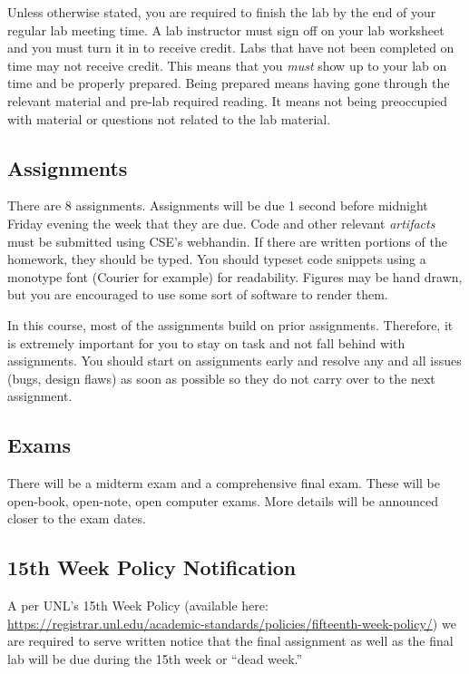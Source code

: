 \documentclass[12pt]{scrartcl}
\begin{document}
Unless otherwise stated, you are required to finish the lab by 
the end of your regular lab meeting time.  A lab instructor must 
sign off on your lab worksheet and you must turn it in to receive 
credit.  Labs that have not been completed on time may not receive
credit. This means that you \emph{must} show up to your lab on
time and be properly prepared.  Being prepared means having gone
through the relevant material and pre-lab required reading.  It 
means not being preoccupied with material or questions not related
to the lab material.  

\subsection{Assignments}

There are 8 assignments.  Assignments will be due 1 second before 
midnight Friday evening the week that they are due.  Code and other 
relevant \emph{artifacts} must be submitted using CSE's webhandin.  
If there are written portions of the homework, they should be typed.  
You should typeset code snippets using a monotype font (Courier for 
example) for readability.  Figures may be hand drawn, but you are 
encouraged to use some sort of software to render them.  

In this course, most of the assignments build on prior assignments.  
Therefore, it is extremely important for you to stay on task and not 
fall behind with assignments.  You should start on assignments early 
and resolve any and all issues (bugs, design flaws) as soon as 
possible so they do not carry over to the next assignment.

\subsection{Exams}

There will be a midterm exam and a comprehensive final exam.  These
will be open-book, open-note, open computer exams.  More details will 
be announced closer to the exam dates.

\subsection{15th Week Policy Notification}
\label{subsection:deadweek}

A per UNL's 15th Week Policy (available here: \url{https://registrar.unl.edu/academic-standards/policies/fifteenth-week-policy/}) we are required
to serve written notice that the final assignment
as well as the final lab will be due during the 15th 
week or ``dead week.''
\end{document}
